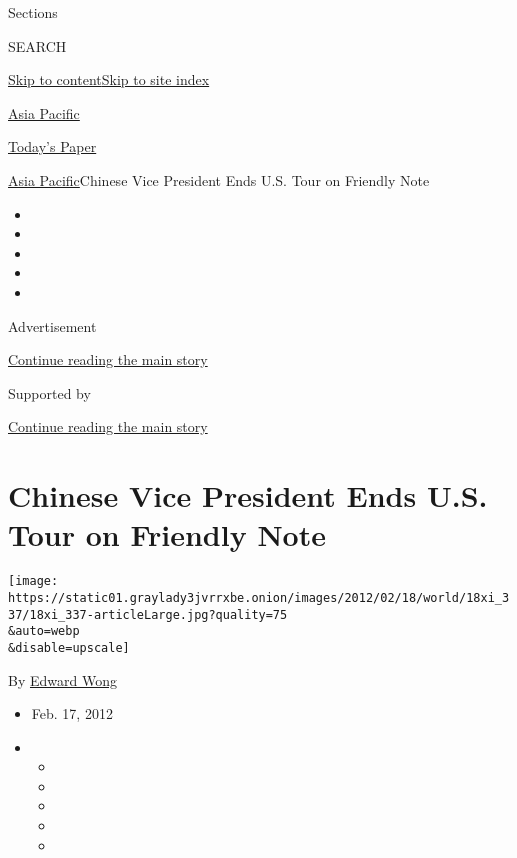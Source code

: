 Sections

SEARCH

\protect\hyperlink{site-content}{Skip to
content}\protect\hyperlink{site-index}{Skip to site index}

\href{https://www.nytimes3xbfgragh.onion/section/world/asia}{Asia
Pacific}

\href{https://myaccount.nytimes3xbfgragh.onion/auth/login?response_type=cookie\&client_id=vi}{}

\href{https://www.nytimes3xbfgragh.onion/section/todayspaper}{Today's
Paper}

\href{/section/world/asia}{Asia Pacific}\textbar{}Chinese Vice President
Ends U.S. Tour on Friendly Note

\begin{itemize}
\item
\item
\item
\item
\item
\end{itemize}

Advertisement

\protect\hyperlink{after-top}{Continue reading the main story}

Supported by

\protect\hyperlink{after-sponsor}{Continue reading the main story}

\hypertarget{chinese-vice-president-ends-us-tour-on-friendly-note}{%
\section{Chinese Vice President Ends U.S. Tour on Friendly
Note}\label{chinese-vice-president-ends-us-tour-on-friendly-note}}

\texttt{[image: https://static01.graylady3jvrrxbe.onion/images/2012/02/18/world/18xi\_337/18xi\_337-articleLarge.jpg?quality=75\\\&auto=webp\\\&disable=upscale]}

By \href{https://www.nytimes3xbfgragh.onion/by/edward-wong}{Edward Wong}

\begin{itemize}
\item
  Feb. 17, 2012
\item
  \begin{itemize}
  \item
  \item
  \item
  \item
  \item
  \end{itemize}
\end{itemize}

